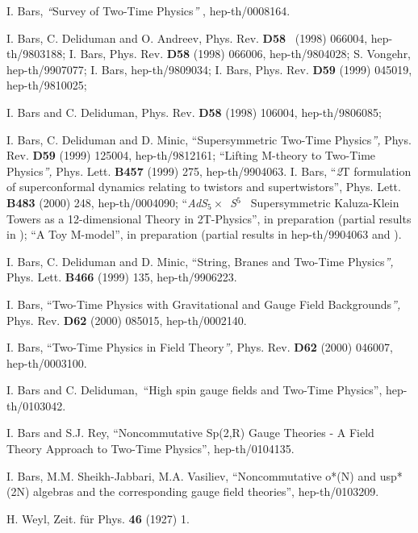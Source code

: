\documentclass[a4paper,12pt]{article}
\begin{document}
\begin{thebibliography}{99}
  I. Bars, \textit{``}Survey of Two-Time Physics\textit{''}%
, hep-th/0008164.

  I. Bars, C. Deliduman and O. Andreev, Phys. Rev. \textbf{D58%
} \ (1998) 066004, hep-th/9803188; I. Bars, Phys. Rev. \textbf{D58} (1998)
066006, hep-th/9804028; S. Vongehr, hep-th/9907077; I. Bars, hep-th/9809034;
I. Bars, Phys. Rev. \textbf{D59} (1999) 045019, hep-th/9810025;

  I. Bars and C. Deliduman, Phys. Rev. \textbf{D58} (1998)
106004, hep-th/9806085;

  I. Bars, C. Deliduman and D. Minic, ``Supersymmetric
Two-Time Physics\textit{'', }Phys. Rev. \textbf{D59} (1999) 125004,
hep-th/9812161; ``Lifting M-theory to Two-Time Physics\textit{'', }Phys.
Lett. \textbf{B457} (1999) 275, hep-th/9904063. \newline
I. Bars, ``\textit{2}T formulation of superconformal dynamics relating to
twistors and supertwistors'', Phys. Lett. \textbf{B483} (2000) 248,
hep-th/0004090; ``\textit{AdS}$_{5}\times $\textit{\ S}$^{5}$\textit{\ }%
Supersymmetric Kaluza-Klein Towers as a 12-dimensional Theory in
2T-Physics'', in preparation (partial results in \cite{survey2T}); ``A Toy
M-model'', in preparation (partial results in hep-th/9904063 and \cite
{survey2T}).

  I. Bars, C. Deliduman and D. Minic, ``String, Branes and
Two-Time Physics\textit{'', }Phys. Lett. \textbf{B466} (1999) 135,
hep-th/9906223.

  I. Bars, ``Two-Time Physics with Gravitational and Gauge
Field Backgrounds\textit{'', }Phys. Rev. \textbf{D62} (2000) 085015,
hep-th/0002140.

  I. Bars, ``Two-Time Physics in Field Theory\textit{'', }%
Phys. Rev. \textbf{D62} (2000) 046007, hep-th/0003100.

  I. Bars and C. Deliduman,\ ``High spin gauge fields and
Two-Time Physics'', hep-th/0103042.

  I. Bars and S.J. Rey, ``Noncommutative Sp(2,R) Gauge
Theories - A Field Theory Approach to Two-Time Physics'', hep-th/0104135.

  I. Bars, M.M. Sheikh-Jabbari, M.A. Vasiliev,
``Noncommutative o*(N) and usp*(2N) algebras and the corresponding gauge
field theories'', hep-th/0103209.

  H. Weyl, Zeit. f\"ur Phys. \textbf{46} (1927) 1.


\end{thebibliography}
\end{document}
